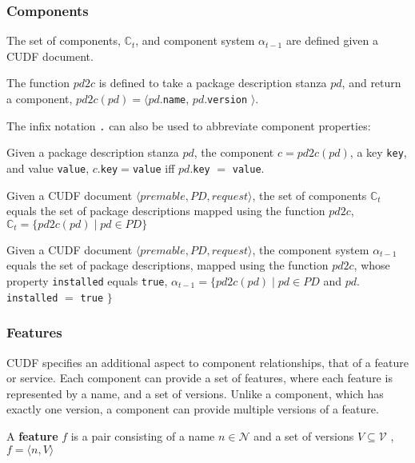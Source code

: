 \subsubsection{Components}
The set of components, $\mathbb{C}_t$, and component system $\alpha_{t-1}$ are defined given a CUDF document.

\begin{defs}
The function $pd2c$ is defined to take a package description stanza $pd$, and return a component, $pd2c(pd) = \langle pd.$\texttt{name}, $pd.$\texttt{version} $\rangle$.
\end{defs}

The infix notation \texttt{.} can also be used to abbreviate component properties: 
\begin{defs}
Given a package description stanza $pd$,  the component $c = pd2c(pd)$, a key \texttt{key}, and value \texttt{value}, 
$c$.\texttt{key}$ = $\texttt{value} iff $pd$.\texttt{key} $ = $ \texttt{value}.
\end{defs}

\begin{defs}
Given a CUDF document $\langle premable, PD, request \rangle$, the set of components $\mathbb{C}_t$ equals the set of package descriptions mapped using the function $pd2c$,
$\mathbb{C}_t = \{pd2c(pd) \mid pd \in PD\}$
\end{defs}

\begin{defs}
Given a CUDF document $\langle premable, PD, request \rangle$, the component system $\alpha_{t-1}$ equals the set of package descriptions, mapped using the function $pd2c$,
whose property \texttt{installed} equals \texttt{true},
$\alpha_{t-1} = \{pd2c(pd) \mid pd \in PD $ and $ pd.$\texttt{installed} $=$ \texttt{true} $\}$
\end{defs}

\subsubsection{Features}
CUDF specifies an additional aspect to component relationships, that of a feature or service.
Each component can provide a set of features, where each feature is represented by a name, and a set of versions.
Unlike a component, which has exactly one version, a component can provide multiple versions of a feature.

\begin{defs}
A \textbf{feature} $f$ is a pair consisting of a name $n \in \mathcal{N}$ and a set of versions $V \subseteq \mathcal{V}$ , 
$f = \langle n,V \rangle$
\end{defs}

